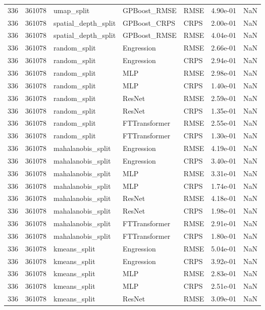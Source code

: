 \begin{tabular}{rrlllrr}
336 & 361078 & umap\_split & GPBoost\_RMSE & RMSE & 4.90e-01 & NaN \\
336 & 361078 & spatial\_depth\_split & GPBoost\_CRPS & CRPS & 2.00e-01 & NaN \\
336 & 361078 & spatial\_depth\_split & GPBoost\_RMSE & RMSE & 4.04e-01 & NaN \\
336 & 361078 & random\_split & Engression & RMSE & 2.66e-01 & NaN \\
336 & 361078 & random\_split & Engression & CRPS & 2.94e-01 & NaN \\
336 & 361078 & random\_split & MLP & RMSE & 2.98e-01 & NaN \\
336 & 361078 & random\_split & MLP & CRPS & 1.40e-01 & NaN \\
336 & 361078 & random\_split & ResNet & RMSE & 2.59e-01 & NaN \\
336 & 361078 & random\_split & ResNet & CRPS & 1.35e-01 & NaN \\
336 & 361078 & random\_split & FTTransformer & RMSE & 2.55e-01 & NaN \\
336 & 361078 & random\_split & FTTransformer & CRPS & 1.30e-01 & NaN \\
336 & 361078 & mahalanobis\_split & Engression & RMSE & 4.19e-01 & NaN \\
336 & 361078 & mahalanobis\_split & Engression & CRPS & 3.40e-01 & NaN \\
336 & 361078 & mahalanobis\_split & MLP & RMSE & 3.31e-01 & NaN \\
336 & 361078 & mahalanobis\_split & MLP & CRPS & 1.74e-01 & NaN \\
336 & 361078 & mahalanobis\_split & ResNet & RMSE & 4.18e-01 & NaN \\
336 & 361078 & mahalanobis\_split & ResNet & CRPS & 1.98e-01 & NaN \\
336 & 361078 & mahalanobis\_split & FTTransformer & RMSE & 2.91e-01 & NaN \\
336 & 361078 & mahalanobis\_split & FTTransformer & CRPS & 1.80e-01 & NaN \\
336 & 361078 & kmeans\_split & Engression & RMSE & 5.04e-01 & NaN \\
336 & 361078 & kmeans\_split & Engression & CRPS & 3.92e-01 & NaN \\
336 & 361078 & kmeans\_split & MLP & RMSE & 2.83e-01 & NaN \\
336 & 361078 & kmeans\_split & MLP & CRPS & 2.51e-01 & NaN \\
336 & 361078 & kmeans\_split & ResNet & RMSE & 3.09e-01 & NaN \\

\end{tabular}
